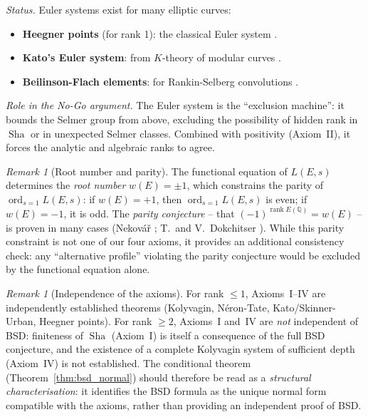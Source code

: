 \documentclass[aps,prd,twocolumn,superscriptaddress,nofootinbib]{revtex4-2}
\theoremstyle{definition}
\theoremstyle{remark}
\newtheorem{remark}[theorem]{Remark}
\DeclareMathOperator{\ord}{ord}
\DeclareMathOperator{\rank}{rank}
\DeclareMathOperator{\Sha}{Sha}
\begin{document}
\textit{Status.} Euler systems exist for many elliptic curves:
\begin{itemize}
\item \textbf{Heegner points} (for rank 1): the classical Euler system \cite{Kolyvagin1990}.
\item \textbf{Kato's Euler system}: from $K$-theory of modular curves \cite{Kato2004}.
\item \textbf{Beilinson-Flach elements}: for Rankin-Selberg convolutions \cite{LLZ2014}.
\end{itemize}

\textit{Role in the No-Go argument.} The Euler system is the ``exclusion machine'': it bounds the Selmer group from above, excluding the possibility of hidden rank in $\Sha$ or in unexpected Selmer classes. Combined with positivity (Axiom~II), it forces the analytic and algebraic ranks to agree.

\begin{remark}[Root number and parity]
\label{rem:root_number}
The functional equation of $L(E,s)$ determines the \textit{root number} $w(E) = \pm 1$, which constrains the parity of $\ord_{s=1} L(E,s)$: if $w(E) = +1$, then $\ord_{s=1} L(E,s)$ is even; if $w(E) = -1$, it is odd. The \textit{parity conjecture} -- that $(-1)^{\rank E(\mathbb{Q})} = w(E)$ -- is proven in many cases (Nekov\'a\v{r} \cite{Nekovar2006}; T.~and V.~Dokchitser \cite{Dokchitser2010}). While this parity constraint is not one of our four axioms, it provides an additional consistency check: any ``alternative profile'' violating the parity conjecture would be excluded by the functional equation alone.
\end{remark}

\begin{remark}[Independence of the axioms]
\label{rem:axiom-independence}
For rank $\leq 1$, Axioms~I--IV are independently established theorems (Kolyvagin, N\'eron-Tate, Kato/Skinner-Urban, Heegner points). For rank $\geq 2$, Axioms~I and~IV are \textit{not} independent of BSD: finiteness of $\Sha$ (Axiom~I) is itself a consequence of the full BSD conjecture, and the existence of a complete Kolyvagin system of sufficient depth (Axiom~IV) is not established. The conditional theorem (Theorem~\ref{thm:bsd_normal}) should therefore be read as a \textit{structural characterisation}: it identifies the BSD formula as the unique normal form compatible with the axioms, rather than providing an independent proof of BSD.
\end{remark}
\end{document}
